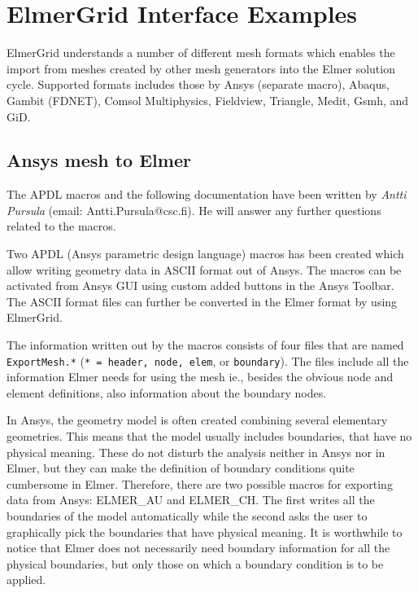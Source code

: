 \chapter{ElmerGrid Interface Examples}

ElmerGrid understands a number of different mesh formats which 
enables the import from meshes created by other mesh generators into
the Elmer solution cycle. Supported formats includes those by Ansys (separate macro), 
Abaqus, Gambit (FDNET), Comsol Multiphysics, Fieldview, Triangle, 
Medit, Gsmh, and GiD.

\section{Ansys mesh to Elmer}

The APDL macros and the following documentation have been written
by {\em Antti Pursula} (email: Antti.Pursula@csc.fi). He will 
answer any further questions related to the macros.

Two APDL (Ansys parametric design language) macros has been created
which allow writing geometry data in ASCII format out of Ansys. The
macros can be activated from Ansys GUI using custom added buttons in
the Ansys Toolbar. The ASCII format files can further be converted in
the Elmer format by using ElmerGrid.

The information written out by the macros consists of four files that
are named \texttt{ExportMesh.*} (\texttt{* = header, node, elem}, or
\texttt{boundary}). The files include all the information Elmer needs for using
the mesh ie., besides the obvious node and element definitions, also
information about the boundary nodes. 


In Ansys, the geometry model is often created combining several
elementary geometries. This means that the model usually includes
boundaries, that have no physical meaning. These do not disturb the
analysis neither in Ansys nor in Elmer, but they can make the
definition of boundary conditions quite cumbersome in
Elmer. Therefore, there are two possible macros for exporting data
from Ansys: ELMER\_AU and ELMER\_CH. The first writes all the boundaries
of the model automatically while the second asks the user to
graphically pick the boundaries that have physical meaning. It is
worthwhile to notice that Elmer does not necessarily need boundary
information for all the physical boundaries, but only those on which a
boundary condition is to be applied.

